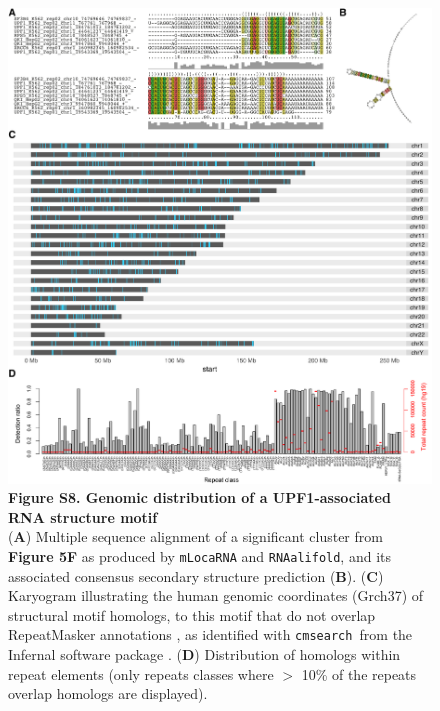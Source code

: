 \documentclass{bmcart}
\begin{document}
\begin{figure}
 \includegraphics[width=\textwidth]{SF8}
 \caption*{ \textbf{ Figure S8. Genomic distribution of a UPF1-associated RNA structure motif }\\
(\textbf{A}) Multiple sequence alignment of a significant cluster from \textbf{Figure 5F} as produced by \texttt{mLocaRNA} and \texttt{RNAalifold}, and its associated consensus secondary structure prediction  (\textbf{B}). (\textbf{C}) Karyogram illustrating the human genomic coordinates (Grch37) of structural motif homologs, to this motif that do not overlap RepeatMasker annotations \cite{smit2010repeatmodeler}, as identified with \texttt{cmsearch }from the Infernal software package \cite{nawrocki2013infernal}. (\textbf{D}) Distribution of homologs within repeat elements (only repeats classes where $>$ 10\% of the repeats overlap homologs are displayed). 
}
\end{figure}
\end{document}
